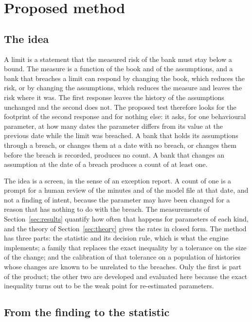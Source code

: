 \section{Proposed method}
\label{sec:proposed-method}

\subsection{The idea}
\label{sec:method-idea}

A limit is a statement that the measured risk of the bank must stay below a bound. The measure is a function of the book and of the assumptions, and a bank that breaches a limit can respond by changing the book, which reduces the risk, or by changing the assumptions, which reduces the measure and leaves the risk where it was. The first response leaves the history of the assumptions unchanged and the second does not. The proposed test therefore looks for the footprint of the second response and for nothing else: it asks, for one behavioural parameter, at how many dates the parameter differs from its value at the previous date while the limit was breached. A bank that holds its assumptions through a breach, or changes them at a date with no breach, or changes them before the breach is recorded, produces no count. A bank that changes an assumption at the date of a breach produces a count of at least one.

The idea is a screen, in the sense of an exception report. A count of one is a prompt for a human review of the minutes and of the model file at that date, and not a finding of intent, because the parameter may have been changed for a reason that has nothing to do with the breach. The measurements of Section~\ref{sec:results} quantify how often that happens for parameters of each kind, and the theory of Section~\ref{sec:theory} gives the rates in closed form. The method has three parts: the statistic and its decision rule, which is what the engine implements; a family that replaces the exact inequality by a tolerance on the size of the change; and the calibration of that tolerance on a population of histories whose changes are known to be unrelated to the breaches. Only the first is part of the product; the other two are developed and evaluated here because the exact inequality turns out to be the weak point for re-estimated parameters.

\subsection{From the finding to the statistic}
\label{sec:method-derivation}


